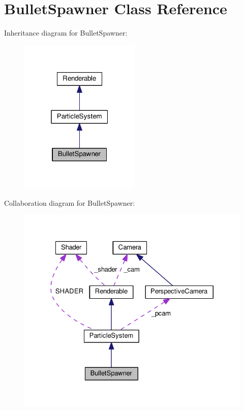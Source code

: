 \hypertarget{class_bullet_spawner}{}\section{Bullet\+Spawner Class Reference}
\label{class_bullet_spawner}


Inheritance diagram for Bullet\+Spawner\+:\nopagebreak
\begin{figure}[H]
\begin{center}
\leavevmode
\includegraphics[width=163pt]{class_bullet_spawner__inherit__graph}
\end{center}
\end{figure}


Collaboration diagram for Bullet\+Spawner\+:\nopagebreak
\begin{figure}[H]
\begin{center}
\leavevmode
\includegraphics[width=327pt]{class_bullet_spawner__coll__graph}
\end{center}
\end{figure}
